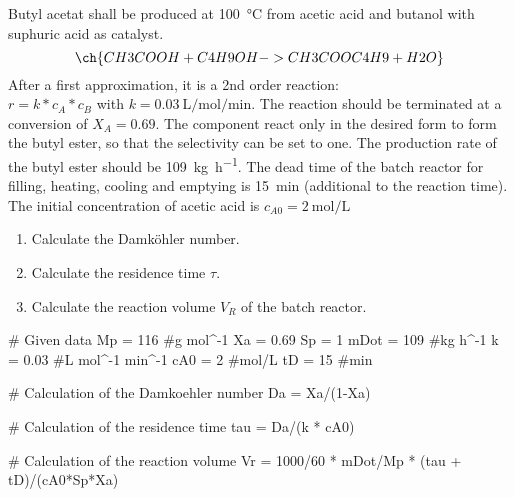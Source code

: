 \begin{question}
Butyl acetat shall be produced at \SI{100}{\celsius} from acetic acid and butanol with suphuric acid as catalyst.
\begin{equation*}
\ch{CH3COOH + C4H9OH -> CH3COOC4H9 + H2O}
\end{equation*}
After a first approximation, it is a 2nd order reaction: \\
$r = k * c_A * c_B$ with $k = \SI{0.03}{\liter\per\mole\per\minute}$. The reaction should be terminated at a conversion of $X_A = 0.69$. The component react only in the desired form to form the butyl ester, so that the selectivity can be set to one. The production rate of the butyl ester should be \SI{109}{\kilo\gram\per\hour}. The dead time of the batch reactor for filling, heating, cooling and emptying is \SI{15}{\minute} (additional to the reaction time). The initial concentration of acetic acid is $c_{A0} = \SI{2}{\mole\per\liter}$ 
\renewcommand{\labelenumi}{\alph{enumi})}
\begin{enumerate}
 \item Calculate the Damköhler number.
 \item Calculate the residence time $\tau$.
 \item Calculate the reaction volume $V_R$ of the batch reactor.
\end{enumerate}
\end{question}
\begin{pycode}
# Given data
Mp = 116 #g mol^-1
Xa = 0.69
Sp = 1
mDot = 109 #kg h^-1
k = 0.03 #L mol^-1 min^-1
cA0 = 2 #mol/L
tD = 15 #min

# Calculation of the Damkoehler number
Da = Xa/(1-Xa)

# Calculation of the residence time
tau = Da/(k * cA0)

# Calculation of the reaction volume
Vr = 1000/60 * mDot/Mp * (tau + tD)/(cA0*Sp*Xa)
\end{pycode}
